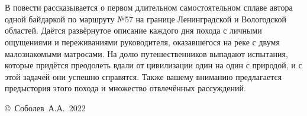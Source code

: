 \chapter*{}

В повести рассказывается о первом длительном самостоятельном сплаве автора одной байдаркой по маршруту №57 на границе Ленинградской и Вологодской областей. Даётся развёрнутое описание каждого дня похода с личными ощущениями и переживаниями руководителя, оказавшегося на реке с двумя малознакомыми матросами. На долю путешественников выпадают испытания, которые придётся преодолеть вдали от цивилизации один на один с природой, и с этой задачей они успешно справятся. Также вашему вниманию предлагается предыстория этого похода и множество отвлечённых рассуждений.

\vspace{\fill}
\begin{flushright}
	\copyright~Соболев~А.А.~2022
\end{flushright}